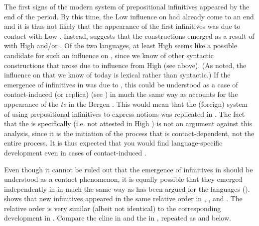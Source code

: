 \documentclass[output=paper]{langscibook}
\begin{document}
The first signs of the modern system of prepositional  infinitives appeared by the end of the  period. By this time, the Low  influence on  had already come to an end and it is thus not likely that the appearance of the first  infinitives was due to contact with Low . Instead, \citet{Holm1967} suggests that the constructions emerged as a result of  with High  and/or . Of the two languages, at least High  seems like a possible candidate for such an influence on , since we know of other syntactic constructions that arose due to influence from High  (see  above). (As noted, the  influence on  that we know of today is lexical rather than syntactic.) If the emergence of  infinitives in  was due to , this could be understood as a case of contact-induced (or replica)  (see \citealt{HeineKuteva2003, HeineKuteva2005}) in much the same way as \citet{Nesse2002} accounts for the appearance of the  \textit{te} in the  Bergen . This would mean that the (foreign) system of using prepositional infinitives to express  notions was replicated in . The fact that the  is specifically  (i.e. not attested in High ) is not an argument against this analysis, since it is the initiation of the  process that is contact-dependent, not the entire process. It is thus expected that you would find language-specific development even in cases of contact-induced . 



Even though it cannot be ruled out that the emergence of  infinitives in  should be understood as a contact phenomenon, it is equally possible that they emerged independently in  in much the same way as has been argued for the  languages (\citealt{Schulte2007Prepositional, Schulte2007What}). \citet{Schulte2007Prepositional, Schulte2007What} shows that new  infinitives appeared in the same relative order in , , and . The relative order is very similar (albeit not identical) to the corresponding development in . Compare the  cline in  and the  in , repeated as  and  below. 
\end{document}
